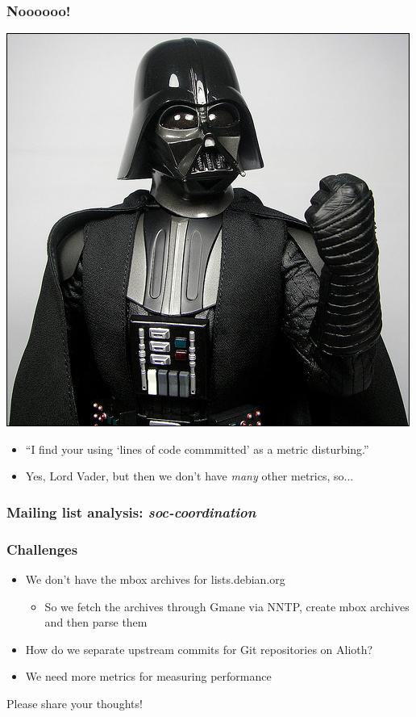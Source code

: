 \documentclass[compress]{beamer}
\begin{document}
\begin{frame}
    \frametitle{Noooooo!}
        \begin{center}
            \includegraphics[scale=.25]{vaderno.jpg}
        \end{center}
        \begin{itemize}
            \item ``I find your using `lines of code commmitted' as a metric disturbing.''
            \pause
            \item Yes, Lord Vader, but then we don't have \textit{many} other metrics, so...
        \end{itemize}
\end{frame}

\begin{frame}
    \frametitle{Mailing list analysis: \textit{soc-coordination}}
\end{frame}

\begin{frame}
    \frametitle{Challenges}
    \begin{itemize}
    \item We don't have the mbox archives for lists.debian.org
        \begin{itemize}
        \pause
        \item So we fetch the archives through Gmane via NNTP, create mbox archives and then parse them
        \end{itemize}
    \pause
    \item How do we separate upstream commits for Git repositories on Alioth?
    \pause
    \item We need more metrics for measuring performance
    \pause
    \end{itemize}
    \center Please share your thoughts! 
\end{frame}
\end{document}

